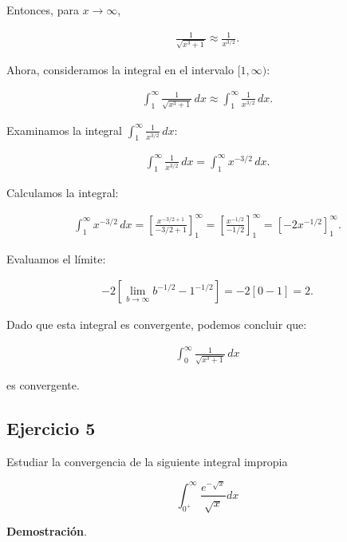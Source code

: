 \documentclass{article}
\begin{document}
    Entonces, para \( x \to \infty \),

    \begin{align*}
    \frac{1}{\sqrt{x^3 + 1}} \approx \frac{1}{x^{3/2}}.
    \end{align*}

    Ahora, consideramos la integral en el intervalo \([1, \infty)\):

    \begin{align*}
    \int_{1}^{\infty} \frac{1}{\sqrt{x^3 + 1}} \, dx \approx \int_{1}^{\infty} \frac{1}{x^{3/2}} \, dx.
    \end{align*}

    Examinamos la integral \( \int_{1}^{\infty} \frac{1}{x^{3/2}} \, dx \):

    \begin{align*}
    \int_{1}^{\infty} \frac{1}{x^{3/2}} \, dx = \int_{1}^{\infty} x^{-3/2} \, dx.
    \end{align*}

    Calculamos la integral:

    \begin{align*}
    \int_{1}^{\infty} x^{-3/2} \, dx = \left[ \frac{x^{-3/2+1}}{-3/2+1} \right]_{1}^{\infty} = \left[ \frac{x^{-1/2}}{-1/2} \right]_{1}^{\infty} = \left[ -2 x^{-1/2} \right]_{1}^{\infty}.
    \end{align*}

    Evaluamos el límite:

    \begin{align*}
    -2 \left[ \lim_{b \to \infty} b^{-1/2} - 1^{-1/2} \right] = -2 \left[ 0 - 1 \right] = 2.
    \end{align*}

    Dado que esta integral es convergente, podemos concluir que:

    \begin{align*}
    \int_{0}^{\infty} \frac{1}{\sqrt{x^{3}+1}} \, dx
    \end{align*}

    es convergente.

    \subsection*{Ejercicio 5}

    Estudiar la convergencia de la siguiente integral impropia

    $$
    \int_{0^{+}}^{\infty} \frac{e^{-\sqrt{x}}}{\sqrt{x}} d x
    $$

    \textbf{Demostración}.\\
\end{document}
